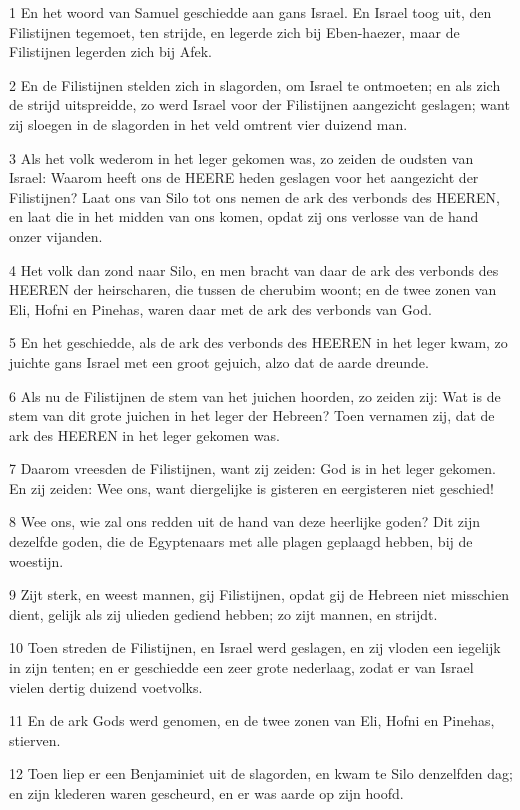 \par 1 En het woord van Samuel geschiedde aan gans Israel. En Israel toog uit, den Filistijnen tegemoet, ten strijde, en legerde zich bij Eben-haezer, maar de Filistijnen legerden zich bij Afek.
\par 2 En de Filistijnen stelden zich in slagorden, om Israel te ontmoeten; en als zich de strijd uitspreidde, zo werd Israel voor der Filistijnen aangezicht geslagen; want zij sloegen in de slagorden in het veld omtrent vier duizend man.
\par 3 Als het volk wederom in het leger gekomen was, zo zeiden de oudsten van Israel: Waarom heeft ons de HEERE heden geslagen voor het aangezicht der Filistijnen? Laat ons van Silo tot ons nemen de ark des verbonds des HEEREN, en laat die in het midden van ons komen, opdat zij ons verlosse van de hand onzer vijanden.
\par 4 Het volk dan zond naar Silo, en men bracht van daar de ark des verbonds des HEEREN der heirscharen, die tussen de cherubim woont; en de twee zonen van Eli, Hofni en Pinehas, waren daar met de ark des verbonds van God.
\par 5 En het geschiedde, als de ark des verbonds des HEEREN in het leger kwam, zo juichte gans Israel met een groot gejuich, alzo dat de aarde dreunde.
\par 6 Als nu de Filistijnen de stem van het juichen hoorden, zo zeiden zij: Wat is de stem van dit grote juichen in het leger der Hebreen? Toen vernamen zij, dat de ark des HEEREN in het leger gekomen was.
\par 7 Daarom vreesden de Filistijnen, want zij zeiden: God is in het leger gekomen. En zij zeiden: Wee ons, want diergelijke is gisteren en eergisteren niet geschied!
\par 8 Wee ons, wie zal ons redden uit de hand van deze heerlijke goden? Dit zijn dezelfde goden, die de Egyptenaars met alle plagen geplaagd hebben, bij de woestijn.
\par 9 Zijt sterk, en weest mannen, gij Filistijnen, opdat gij de Hebreen niet misschien dient, gelijk als zij ulieden gediend hebben; zo zijt mannen, en strijdt.
\par 10 Toen streden de Filistijnen, en Israel werd geslagen, en zij vloden een iegelijk in zijn tenten; en er geschiedde een zeer grote nederlaag, zodat er van Israel vielen dertig duizend voetvolks.
\par 11 En de ark Gods werd genomen, en de twee zonen van Eli, Hofni en Pinehas, stierven.
\par 12 Toen liep er een Benjaminiet uit de slagorden, en kwam te Silo denzelfden dag; en zijn klederen waren gescheurd, en er was aarde op zijn hoofd.
